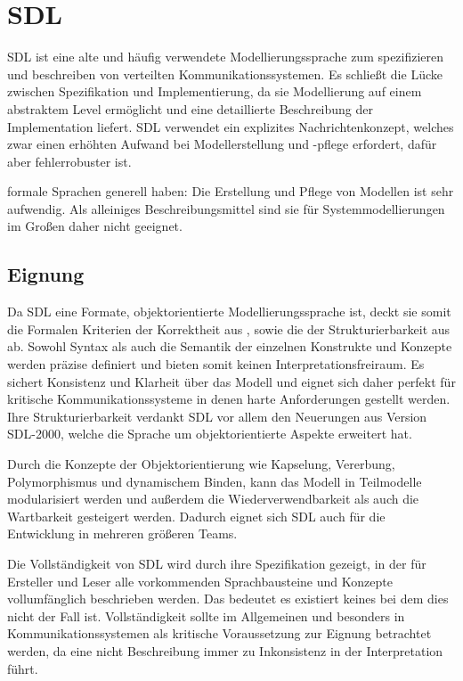 \section{SDL}
\label{sc:SDLB}
\ac{SDL} ist eine alte und häufig verwendete Modellierungssprache zum spezifizieren und beschreiben von verteilten Kommunikationssystemen. 
Es schließt die Lücke zwischen Spezifikation und Implementierung, da sie Modellierung auf einem abstraktem Level ermöglicht und eine detaillierte Beschreibung der Implementation liefert. \ac{SDL} verwendet ein  explizites  Nachrichtenkonzept,  welches  zwar  einen  erhöhten  Aufwand  bei  Modellerstellung und -pflege erfordert, dafür aber fehlerrobuster ist. 


formale Sprachen generell haben: Die Erstellung und Pflege von Modellen ist sehr aufwendig. Als alleiniges Beschreibungsmittel sind sie für Systemmodellierungen im Großen daher nicht geeignet.
\subsection{Eignung}
\label{scc:SDL_Eignung}
Da \ac{SDL} eine Formate, objektorientierte Modellierungssprache ist, deckt sie somit die Formalen Kriterien der Korrektheit aus \pageref{scc:Korrektheit}, sowie die der Strukturierbarkeit aus \pageref{scc:Strukturierbarkeit} ab. Sowohl Syntax als auch die Semantik der einzelnen Konstrukte und Konzepte werden präzise definiert und bieten somit keinen Interpretationsfreiraum. Es sichert Konsistenz und Klarheit über das Modell und eignet sich daher perfekt für kritische Kommunikationssysteme in denen harte Anforderungen gestellt werden. Ihre Strukturierbarkeit verdankt \ac{SDL} vor allem den Neuerungen aus Version \ac{SDL}-2000, welche die Sprache um objektorientierte Aspekte erweitert hat.

Durch die Konzepte der Objektorientierung wie Kapselung, Vererbung, Polymorphismus und dynamischem Binden, kann das Modell in Teilmodelle modularisiert werden und außerdem die Wiederverwendbarkeit als auch die Wartbarkeit gesteigert werden. Dadurch eignet sich \ac{SDL} auch für die Entwicklung in mehreren größeren Teams. 

Die Vollständigkeit von \ac{SDL} wird durch ihre Spezifikation gezeigt, in der für Ersteller und Leser alle vorkommenden Sprachbausteine und Konzepte vollumfänglich beschrieben werden. Das bedeutet es existiert keines bei dem dies nicht der Fall ist. Vollständigkeit sollte im Allgemeinen und besonders in Kommunikationssystemen als kritische Voraussetzung zur Eignung betrachtet werden, da eine nicht Beschreibung immer zu Inkonsistenz in der Interpretation führt.

